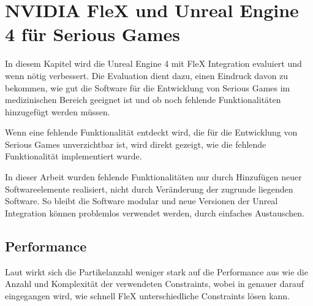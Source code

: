 \chapter{NVIDIA FleX und Unreal Engine 4 für Serious Games}
\label{chap_Flex_Engine}

In diesem Kapitel wird die Unreal Engine 4 mit FleX Integration evaluiert und wenn nötig verbessert. Die Evaluation dient dazu, einen Eindruck davon zu bekommen, wie gut die Software für die Entwicklung von Serious Games im medizinischen Bereich geeignet ist und ob noch fehlende Funktionalitäten hinzugefügt werden müssen. 

Wenn eine fehlende Funktionalität entdeckt wird, die für die Entwicklung von \linebreak  Serious Games unverzichtbar ist, wird direkt gezeigt, wie die fehlende Funktionalität implementiert wurde.

In dieser Arbeit wurden fehlende Funktionalitäten nur durch Hinzufügen neuer Softwareelemente realisiert, nicht durch Veränderung der zugrunde liegenden Software. So bleibt die Software modular und neue Versionen der Unreal Integration können problemlos verwendet werden, durch einfaches Austauschen. 


\section{Performance}
\label{sec_performance}



Laut \cite{FlexD3D} wirkt sich die Partikelanzahl weniger stark auf die Performance aus wie die Anzahl und Komplexität der verwendeten Constraints, wobei in \cite{FlexD3D} genauer darauf eingegangen wird, wie schnell FleX unterschiedliche Constraints lösen kann.

